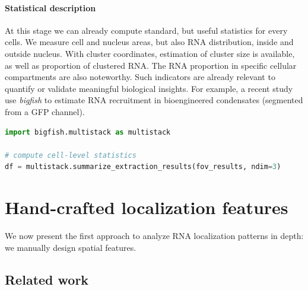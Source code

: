 \paragraph{Statistical description}

At this stage we can already compute standard, but useful statistics for every cells.
We measure cell and nucleus areas, but also \ac{RNA} distribution, inside and outside nucleus.
With cluster coordinates, estimation of cluster size is available, as well as proportion of clustered \ac{RNA}.
The \ac{RNA} proportion in specific cellular compartments are also noteworthy.
Such indicators are already relevant to quantify or validate meaningful biological insights.
For example, a recent study~\cite{cochard_rna_2022} use \emph{bigfish} to estimate \ac{RNA} recruitment in bioengineered condensates (segmented from a \ac{GFP} channel).\\

\begin{minipage}{0.9\textwidth}
\begin{lstlisting}[language=Python]
import bigfish.multistack as multistack

# compute cell-level statistics
df = multistack.summarize_extraction_results(fov_results, ndim=3)
\end{lstlisting}
\end{minipage}

\section{Hand-crafted localization features} \label{sec:hand_features}

We now present the first approach to analyze \ac{RNA} localization patterns in depth: we manually design spatial features.

\subsection{Related work} \label{subsec:related_work_hand_features}



